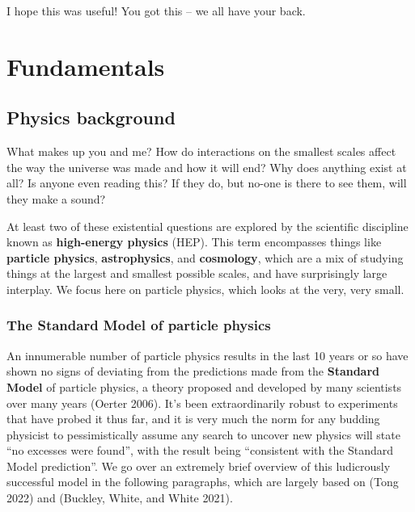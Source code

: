 \documentclass[
  11pt,
  numbers=noendperiod]{book}
\begin{document}
I hope this was useful! You got this -- we all have your back.

\part{Fundamentals}

\hypertarget{physics-background}{%
\chapter{Physics background}\label{physics-background}}

What makes up you and me? How do interactions on the smallest scales
affect the way the universe was made and how it will end? Why does
anything exist at all? Is anyone even reading this? If they do, but
no-one is there to see them, will they make a sound?

At least two of these existential questions are explored by the
scientific discipline known as \textbf{high-energy physics} (HEP). This
term encompasses things like \textbf{particle physics},
\textbf{astrophysics}, and \textbf{cosmology}, which are a mix of
studying things at the largest and smallest possible scales, and have
surprisingly large interplay. We focus here on particle physics, which
looks at the very, very small.

\section{The Standard Model of particle physics}

An innumerable number of particle physics results in the last 10 years
or so have shown no signs of deviating from the predictions made from
the \textbf{Standard Model} of particle physics, a theory proposed and
developed by many scientists over many years (Oerter 2006). It's been
extraordinarily robust to experiments that have probed it thus far, and
it is very much the norm for any budding physicist to pessimistically
assume any search to uncover new physics will state ``no excesses were
found'', with the result being ``consistent with the Standard Model
prediction''. We go over an extremely brief overview of this ludicrously
successful model in the following paragraphs, which are largely based on
(Tong 2022) and (Buckley, White, and White 2021).
\end{document}

